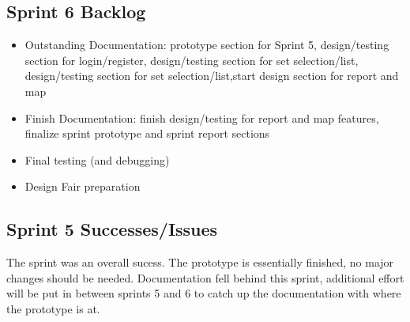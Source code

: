 \subsection{Sprint 6 Backlog}
\begin{itemize}
\item Outstanding Documentation: prototype section for Sprint 5, design/testing section for login/register, design/testing section for set selection/list, design/testing section for set selection/list,start design section for report and map
\item Finish Documentation: finish design/testing for report and map features, finalize sprint prototype and sprint report sections
\item Final testing (and debugging)
\item Design Fair preparation
\end{itemize}

\subsection{Sprint 5 Successes/Issues}
The sprint was an overall sucess.  The prototype is essentially finished, no major changes should be needed. Documentation fell behind this sprint, additional effort will be put in between sprints 5 and 6 to catch up the documentation with where the prototype is at.
